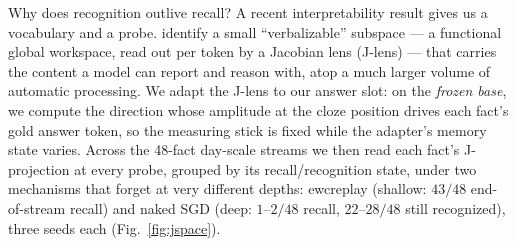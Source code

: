 \documentclass[11pt]{article}
\begin{document}
Why does recognition outlive recall? A recent interpretability result gives us a vocabulary and a
probe. \citet{jspace2026} identify a small ``verbalizable'' subspace --- a functional global
workspace, read out per token by a Jacobian lens (J-lens) --- that carries the content a model can
report and reason with, atop a much larger volume of automatic processing. We adapt the J-lens to
our answer slot: on the \emph{frozen base}, we compute the direction whose amplitude at the cloze
position drives each fact's gold answer token, so the measuring stick is fixed while the adapter's
memory state varies. Across the 48-fact day-scale streams we then read each fact's J-projection
at every probe,
grouped by its recall/recognition state, under two mechanisms that forget at very different depths:
ewcreplay (shallow: $43/48$ end-of-stream recall) and naked SGD (deep: $1\text{--}2/48$ recall,
$22\text{--}28/48$ still recognized), three seeds each (Fig.~\ref{fig:jspace}).
\end{document}
